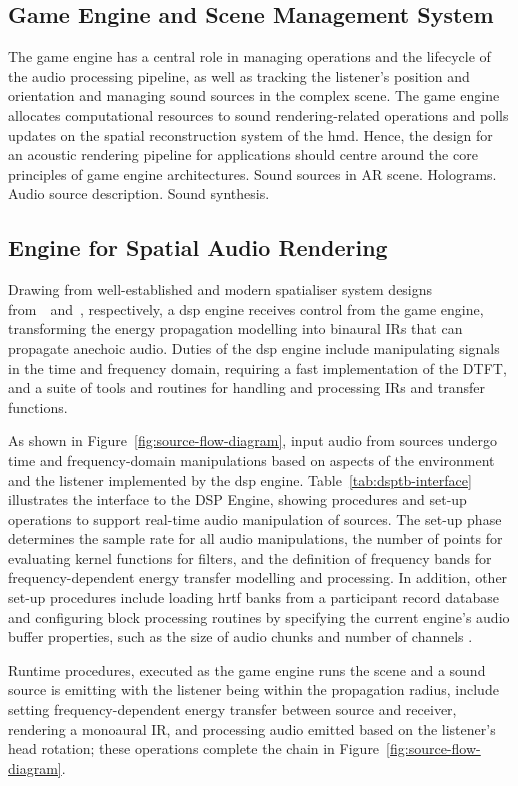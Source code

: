 \subsection{Game Engine and Scene Management System}
The game engine has a central role in managing operations and the lifecycle of the audio processing pipeline, as well as tracking the listener's position and orientation and managing sound sources in the complex scene. The game engine allocates computational resources to sound rendering-related operations and polls updates on the spatial reconstruction system of the \acrshort{hmd}. Hence, the design for an acoustic rendering pipeline for applications should centre around the core principles of game engine architectures.
Sound sources in AR scene. Holograms. Audio source description. Sound synthesis.

\subsection{Engine for Spatial Audio Rendering}
Drawing from well-established and modern spatialiser system designs from~\cite{naef2002spatialized}~and~\cite{lakka2021x3d}, respectively, a \acrshort{dsp} engine receives control from the game engine, transforming the energy propagation modelling into binaural IRs that can propagate anechoic audio. Duties of the \acrshort{dsp} engine include manipulating signals in the time and frequency domain, requiring a fast implementation of the DTFT, and a suite of tools and routines for handling and processing IRs and transfer functions.\par
As shown in Figure~\ref{fig:source-flow-diagram}, input audio from sources undergo time and frequency-domain manipulations based on aspects of the environment and the listener implemented by the \acrshort{dsp} engine. Table~\ref{tab:dsptb-interface} illustrates the interface to the DSP Engine, showing procedures and set-up operations to support real-time audio manipulation of sources. The set-up phase determines the sample rate for all audio manipulations, the number of points for evaluating kernel functions for filters, and the definition of frequency bands for frequency-dependent energy transfer modelling and processing. In addition, other set-up procedures include loading \acrshort{hrtf} banks from a participant record database and configuring block processing routines by specifying the current engine's audio buffer properties, such as the size of audio chunks and number of channels \citep{hoene2017mysofa}.\par
Runtime procedures, executed as the game engine runs the scene and a sound source is emitting with the listener being within the propagation radius, include setting frequency-dependent energy transfer between source and receiver, rendering a monoaural IR, and processing audio emitted based on the listener's head rotation; these operations complete the chain in Figure~\ref{fig:source-flow-diagram}.\par


